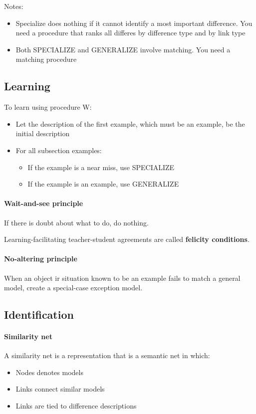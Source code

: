 \documentclass{article}
\begin{document}
Notes:
\begin{itemize}
  \item Specialize does nothing if it cannot identify a most
    important difference. You need a procedure that ranks all
    differes by difference type and by link type
  \item Both SPECIALIZE and GENERALIZE involve matching. You need a
    matching procedure
\end{itemize}

\subsection{Learning}

To learn using procedure W:
\begin{itemize}
  \item Let the description of the first example, which must be an
    example, be the initial description
  \item For all subsection examples:
    \begin{itemize}
      \item If the example is a near miss, use SPECIALIZE
      \item If the example is an example, use GENERALIZE
    \end{itemize}
\end{itemize}

\paragraph{Wait-and-see principle} If there is doubt about 
what to do, do nothing.

Learning-facilitating teacher-student agreements are called
\textbf{felicity conditions}.

\paragraph{No-altering principle} When an object ir situation known
to be an example fails to match a general model, create a
special-case exception model.

\subsection{Identification}

\paragraph{Similarity net} A similarity net is a representation
that is a semantic net in which:\begin{itemize}
  \item Nodes denotes models
  \item Links connect similar models
  \item Links are tied to difference descriptions
\end{itemize}
\end{document}
